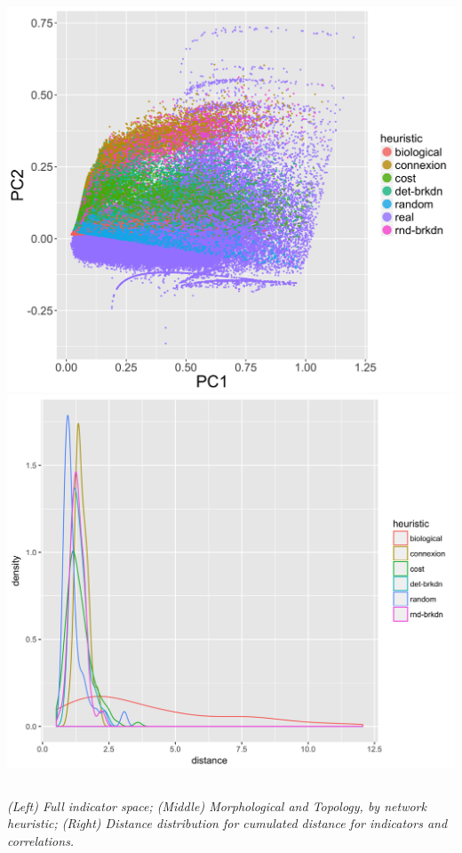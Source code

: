 \documentclass[english,11pt]{beamer}
\begin{document}
{\begin{columns}
\includegraphics[width=\textwidth]{figures/coevol_pca_network_byheuristic}
\includegraphics[width=\textwidth]{figures/coevol_corrs-distrib_rhoasize4}

\end{columns}

\footnotesize\textit{(Left) Full indicator space; (Middle) Morphological and Topology, by network heuristic; (Right) Distance distribution for cumulated distance for indicators and correlations.}

}
\end{document}
